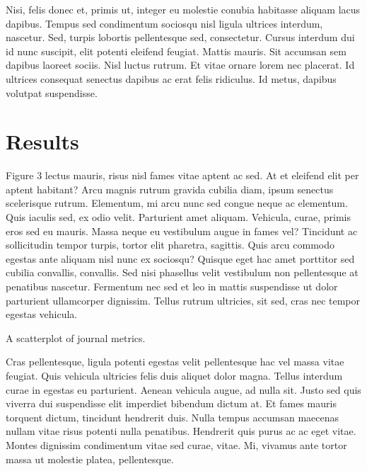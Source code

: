\documentclass[
  12,
]{article}
\begin{document}
Nisi, felis donec et, primis ut, integer eu molestie conubia habitasse
aliquam lacus dapibus. Tempus sed condimentum sociosqu nisl ligula
ultrices interdum, nascetur. Sed, turpis lobortis pellentesque sed,
consectetur. Cursus interdum dui id nunc suscipit, elit potenti eleifend
feugiat. Mattis mauris. Sit accumsan sem dapibus laoreet sociis. Nisl
luctus rutrum. Et vitae ornare lorem nec placerat. Id ultrices consequat
senectus dapibus ac erat felis ridiculus. Id metus, dapibus volutpat
suspendisse.

\hypertarget{results}{%
\section{Results}\label{results}}

Figure 3 lectus mauris, risus nisl fames vitae aptent ac sed. At et
eleifend elit per aptent habitant? Arcu magnis rutrum gravida cubilia
diam, ipsum senectus scelerisque rutrum. Elementum, mi arcu nunc sed
congue neque ac elementum. Quis iaculis sed, ex odio velit. Parturient
amet aliquam. Vehicula, curae, primis eros sed eu mauris. Massa neque eu
vestibulum augue in fames vel? Tincidunt ac sollicitudin tempor turpis,
tortor elit pharetra, sagittis. Quis arcu commodo egestas ante aliquam
nisl nunc ex sociosqu? Quisque eget hac amet porttitor sed cubilia
convallis, convallis. Sed nisi phasellus velit vestibulum non
pellentesque at penatibus nascetur. Fermentum nec sed et leo in mattis
suspendisse ut dolor parturient ullamcorper dignissim. Tellus rutrum
ultricies, sit sed, cras nec tempor egestas vehicula.

A scatterplot of journal metrics.

Cras pellentesque, ligula potenti egestas velit pellentesque hac vel
massa vitae feugiat. Quis vehicula ultricies felis duis aliquet dolor
magna. Tellus interdum curae in egestas eu parturient. Aenean vehicula
augue, ad nulla sit. Justo sed quis viverra dui suspendisse elit
imperdiet bibendum dictum at. Et fames mauris torquent dictum, tincidunt
hendrerit duis. Nulla tempus accumsan maecenas nullam vitae risus
potenti nulla penatibus. Hendrerit quis purus ac ac eget vitae. Montes
dignissim condimentum vitae sed curae, vitae. Mi, vivamus ante tortor
massa ut molestie platea, pellentesque.
\end{document}
